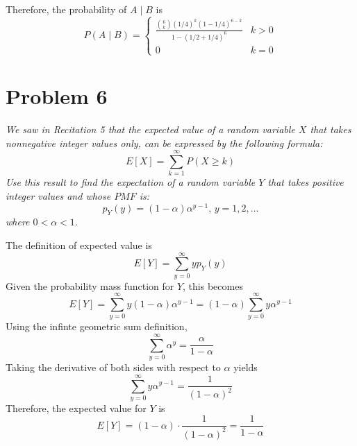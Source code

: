 \documentclass{article}
\begin{document}
Therefore, the probability of $ A \mid B $ is
$$ P(A \mid B) = \begin{cases}
    \frac{\binom{6}{k} (1/4)^k (1 - 1/4)^{6 - k}}{1 - (1/2 + 1/4)^6} & k > 0 \\
    0 & k = 0
\end{cases} $$

\section*{Problem 6}

\textit{We saw in Recitation 5 that the expected value of a random variable $
X $ that takes nonnegative integer values only, can be expressed by the
following formula:}
$$ E [X] = \sum\limits_{k=1}^{\infty} P(X \geq k) $$
\textit{Use this result to find the expectation of a random variable $ Y $
that takes positive integer values and whose $ PMF $ is:}
$$ p_Y(y) = (1 - \alpha) \alpha^{y - 1},\, y = 1, 2, \ldots $$
\textit{where $ 0 < \alpha < 1 $.}

\bigbreak

The definition of expected value is 
$$ E[Y] = \sum\limits_{y = 0}^{\infty} y p_Y(y) $$
Given the probability mass function for $ Y $, this becomes
$$ E[Y] = \sum\limits_{y = 0}^{\infty} y (1 - \alpha) \alpha^{y - 1} = (1 -
\alpha) \sum\limits_{y = 0}^{\infty} y \alpha^{y - 1} $$
Using the infinte geometric sum definition,
$$ \sum\limits_{y = 0}^{\infty} \alpha^y = \frac{\alpha}{1 - \alpha} $$
Taking the derivative of both sides with respect to $ \alpha $ yields
$$ \sum\limits_{y = 0}^{\infty} y \alpha^{y - 1} = \frac{1}{(1 - \alpha)^2} $$
Therefore, the expected value for $ Y $ is
$$ E[Y] = (1 - \alpha) \cdot \frac{1}{(1 - \alpha)^2} = \frac{1}{1 - \alpha} $$
\end{document}
